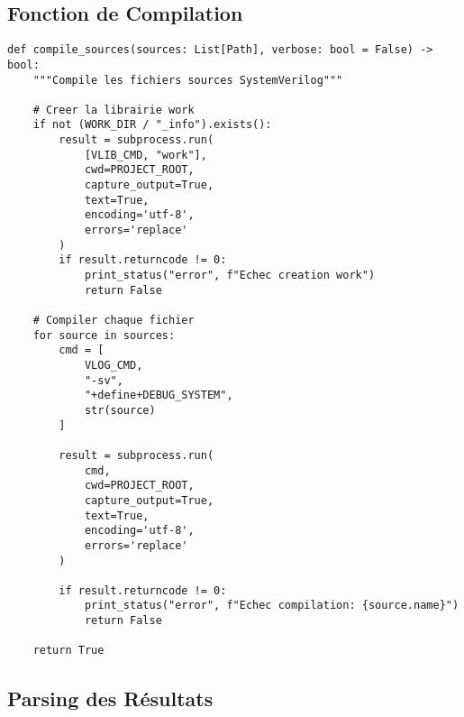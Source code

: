 \documentclass[12pt,a4paper]{article}
\begin{document}
\subsection{Fonction de Compilation}

\begin{lstlisting}[style=python, caption={Compilation des modules SystemVerilog}]
def compile_sources(sources: List[Path], verbose: bool = False) -> bool:
    """Compile les fichiers sources SystemVerilog"""
    
    # Creer la librairie work
    if not (WORK_DIR / "_info").exists():
        result = subprocess.run(
            [VLIB_CMD, "work"],
            cwd=PROJECT_ROOT,
            capture_output=True,
            text=True,
            encoding='utf-8',
            errors='replace'
        )
        if result.returncode != 0:
            print_status("error", f"Echec creation work")
            return False
    
    # Compiler chaque fichier
    for source in sources:
        cmd = [
            VLOG_CMD,
            "-sv",
            "+define+DEBUG_SYSTEM",
            str(source)
        ]
        
        result = subprocess.run(
            cmd,
            cwd=PROJECT_ROOT,
            capture_output=True,
            text=True,
            encoding='utf-8',
            errors='replace'
        )
        
        if result.returncode != 0:
            print_status("error", f"Echec compilation: {source.name}")
            return False
    
    return True
\end{lstlisting}

\subsection{Parsing des Résultats}
\end{document}
